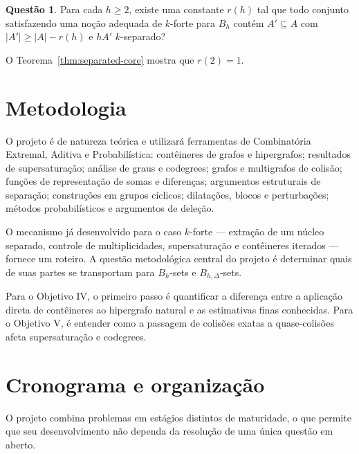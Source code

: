 \documentclass[11pt,a4paper]{article}
\theoremstyle{definition}
\newtheorem{question}[theorem]{Questão}
\theoremstyle{remark}
\begin{document}
\begin{question}
  Para cada \(h\geq2\), existe uma constante \(r(h)\) tal que todo
  conjunto satisfazendo uma noção adequada de \(k\)-forte para
  \(B_h\) contém \(A'\subseteq A\) com \(|A'|\geq|A|-r(h)\) e \(hA'\)
  \(k\)-separado?
\end{question}

O Teorema~\ref{thm:separated-core} mostra que \(r(2)=1\).

\section{Metodologia}

O projeto é de natureza teórica e utilizará ferramentas de Combinatória
Extremal, Aditiva e Probabilística: contêineres de grafos e hipergrafos;
resultados de supersaturação; análise de graus e codegrees; grafos e
multigrafos de colisão; funções de representação de somas e diferenças;
argumentos estruturais de separação; construções em grupos cíclicos;
dilatações, blocos e perturbações; métodos probabilísticos e argumentos
de deleção.

O mecanismo já desenvolvido para o caso \(k\)-forte --- extração de um
núcleo separado, controle de multiplicidades, supersaturação e
contêineres iterados --- fornece um roteiro. A questão metodológica
central do projeto é determinar quais de suas partes se transportam para
\(B_h\)-sets e \(B_{h,\Delta}\)-sets.

Para o Objetivo IV, o primeiro passo é quantificar a diferença entre a
aplicação direta de contêineres ao hipergrafo natural e as estimativas
finas conhecidas. Para o Objetivo V, é entender como a passagem de
colisões exatas a quase-colisões afeta supersaturação e codegrees.

\section{Cronograma e organização}

O projeto combina problemas em estágios distintos de maturidade, o que
permite que seu desenvolvimento não dependa da resolução de uma única
questão em aberto.
\end{document}
